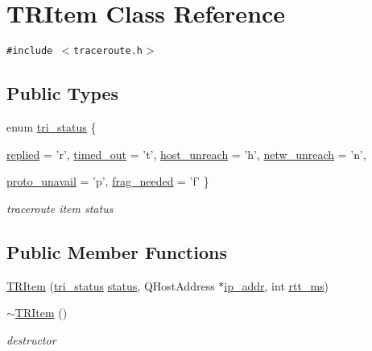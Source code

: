 \hypertarget{classTRItem}{
\section{TRItem Class Reference}
\label{classTRItem}
}
{\tt \#include $<$traceroute.h$>$}

\subsection*{Public Types}
\begin{CompactItemize}
\item 
enum \hyperlink{classTRItem_0514afbd69abf71a2d996386a1658c7b}{tri\_\-status} \{ \par
\hyperlink{classTRItem_0514afbd69abf71a2d996386a1658c7b09e662743b1bf38e0feeb00eee57e2b6}{replied} = 'r', 
\hyperlink{classTRItem_0514afbd69abf71a2d996386a1658c7b95e8f24270cb9566de38298f4bc782fb}{timed\_\-out} = 't', 
\hyperlink{classTRItem_0514afbd69abf71a2d996386a1658c7bf4e0efe50d8ca1905ea17ae399d7db6a}{host\_\-unreach} = 'h', 
\hyperlink{classTRItem_0514afbd69abf71a2d996386a1658c7b6decf2f67231014ae4d8ff26fb1c56a7}{netw\_\-unreach} = 'n', 
\par
\hyperlink{classTRItem_0514afbd69abf71a2d996386a1658c7b9894598b07d0cbe203230938d3dcbfd7}{proto\_\-unavail} = 'p', 
\hyperlink{classTRItem_0514afbd69abf71a2d996386a1658c7b2632d578bab2c004735ec87920374f1c}{frag\_\-needed} = 'f'
 \}
\begin{CompactList}\small\item\em traceroute item status \item\end{CompactList}\end{CompactItemize}
\subsection*{Public Member Functions}
\begin{CompactItemize}
\item 
\hyperlink{classTRItem_6905eecc9647dcd715ab346e7234ffdc}{TRItem} (\hyperlink{classTRItem_0514afbd69abf71a2d996386a1658c7b}{tri\_\-status} \hyperlink{classTRItem_71c41b17d015ce9e9cb76582b780ff40}{status}, QHostAddress $\ast$\hyperlink{classTRItem_42a994228df002a4ab4f0f51df0128d2}{ip\_\-addr}, int \hyperlink{classTRItem_8288ea073bd9d5c3daa68c8f9c782477}{rtt\_\-ms})
\item 
\hypertarget{classTRItem_74737631754b0202e1383b9252cfff6a}{
\hyperlink{classTRItem_74737631754b0202e1383b9252cfff6a}{$\sim$TRItem} ()}
\label{classTRItem_74737631754b0202e1383b9252cfff6a}

\begin{CompactList}\small\item\em destructor \item\end{CompactList}\end{CompactItemize}
